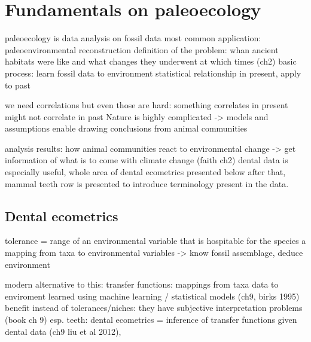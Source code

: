 \documentclass{article}
\begin{document}
\section{Fundamentals on paleoecology}

paleoecology is data analysis on fossil data
most common application: paleoenvironmental reconstruction
    definition of the problem: whan ancient habitats were like and what changes they 
    underwent at which times (ch2)
    basic process: learn fossil data to environment statistical relationship in present, apply to past 

we need correlations but even those are hard: something correlates in present might not correlate in past
Nature is highly complicated -> models and assumptions enable drawing conclusions from animal communities

analysis results: how animal communities react to environmental change -> get information of what is to come with climate change (faith ch2)
dental data is especially useful, whole area of dental ecometrics presented below
after that, mammal teeth row is presented to introduce terminology 
present in the data.

\subsection{Dental ecometrics}

tolerance = range of an environmental variable that is hospitable for the species \cite{Faith_Lyman_2019}
a mapping from taxa to environmental variables -> know fossil assemblage, deduce environment

modern alternative to this: transfer functions: mappings from taxa data to enviroment 
learned using machine learning / statistical models (ch9, birks 1995)
    benefit instead of tolerances/niches: they have subjective interpretation problems (book ch 9)
    esp. teeth: dental ecometrics = inference of transfer functions given dental data (ch9 liu et al 2012), \cite{oksanenHumboldtianApproachLife2019}
\end{document}
